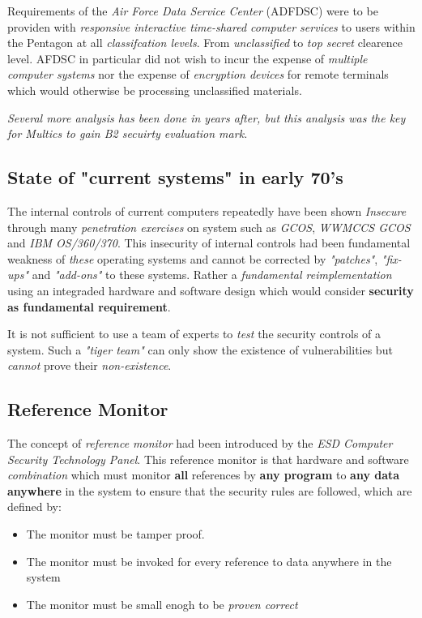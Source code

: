 Requirements of the \textit{Air Force Data Service Center} (ADFDSC) were to be providen with 
\textit{responsive interactive time-shared computer services} to users within the Pentagon
at all \textit{classifcation levels}. From \textit{unclassified} to \textit{top secret} clearence level.
AFDSC in particular did not wish to incur the expense of \textit{multiple computer systems} nor the expense of 
\textit{encryption devices} for remote terminals which would otherwise be processing unclassified materials.

\textit{Several more analysis has been done in years after, but this analysis was the key 
for Multics to gain B2 secuirty evaluation mark.}


\subsection{State of "current systems" in early 70's}

The internal controls of current computers repeatedly have been shown \textit{Insecure} through many
\textit{penetration exercises} on system such as \textit{GCOS}, \textit{WWMCCS GCOS} and \textit{IBM OS/360/370}.
This insecurity of internal controls had been fundamental weakness of \textit{these} operating systems 
and cannot be corrected by \textit{"patches"}, \textit{"fix-ups"} and \textit{"add-ons"} to these systems.
Rather a \textit{fundamental reimplementation} using an integraded hardware and software design which would 
consider \textbf{security as fundamental requirement}.

It is not sufficient to use a team of experts to \textit{test} the security controls of a system. Such a 
\textit{"tiger team"} can only show the existence of vulnerabilities but \textit{cannot} 
prove their \textit{non-existence}.

\subsection{Reference Monitor}

The concept of \textit{reference monitor} had been introduced by the \textit{ESD Computer Security 
Technology Panel}. This reference monitor is that hardware and software \textit{combination} which 
must monitor \textbf{all} references by \textbf{any program} to \textbf{any data anywhere} in the 
system to ensure that the security rules are followed, which are defined by:
\begin{itemize}
    \item The monitor must be tamper proof.
    \item The monitor must be invoked for every reference to data anywhere in the system
    \item The monitor must be small enogh to be \textit{proven correct} 
\end{itemize}


